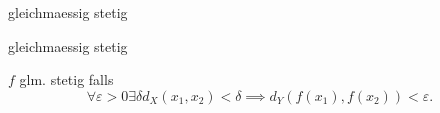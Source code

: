 \documentclass[class=article, crop=false]{standalone}
\begin{document}
\begin{zettel}{gleichmaessig stetig}
\begin{flashcard}[79msj967]{gleichmaessig stetig}
	\begin{definition}
		$f$ glm. stetig falls
		\[
			\forall \varepsilon > 0 \exists \delta d_X (x_1,x_2) < \delta \implies  d_Y (f (x_1 ), f(x_2 )) < \varepsilon
		.\]
	\end{definition}
\end{flashcard}
\end{zettel}
\end{document}
